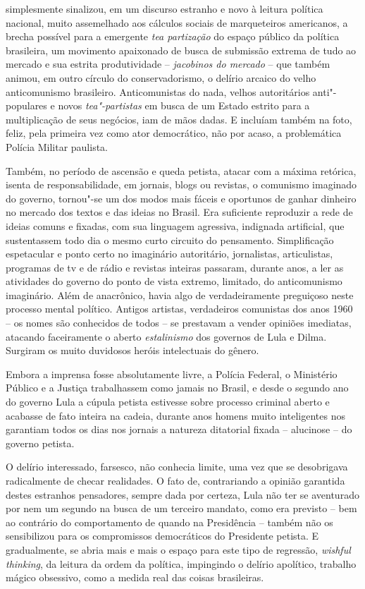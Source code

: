  simplesmente sinalizou, em um discurso estranho e novo à leitura
política nacional, muito assemelhado aos cálculos sociais de
marqueteiros americanos, a brecha possível para a emergente \emph{tea
partização} do espaço público da política brasileira, um movimento
apaixonado de busca de submissão extrema de tudo ao mercado e sua
estrita produtividade -- \emph{jacobinos do mercado} -- que também
animou, em outro círculo do conservadorismo, o delírio arcaico do velho
anticomunismo brasileiro. Anticomunistas do nada, velhos autoritários
anti"-populares e novos \emph{tea"-partistas} em busca de um Estado
estrito para a multiplicação de seus negócios, iam de mãos dadas. E
incluíam também na foto, feliz, pela primeira vez como ator democrático,
não por acaso, a problemática Polícia Militar paulista.

Também, no período de ascensão e queda petista, atacar com a máxima
retórica, isenta de responsabilidade, em jornais, blogs ou revistas, o
comunismo imaginado do governo, tornou"-se um dos modos mais fáceis e
oportunos de ganhar dinheiro no mercado dos textos e das ideias no
Brasil. Era suficiente reproduzir a rede de ideias comuns e fixadas, com
sua linguagem agressiva, indignada artificial, que sustentassem todo dia
o mesmo curto circuito do pensamento. Simplificação espetacular e ponto
certo no imaginário autoritário, jornalistas, articulistas, programas de
tv e de rádio e revistas inteiras passaram, durante anos, a ler as
atividades do governo do ponto de vista extremo, limitado, do
anticomunismo imaginário. Além de anacrônico, havia algo de
verdadeiramente preguiçoso neste processo mental político. Antigos
artistas, verdadeiros comunistas dos anos 1960 -- os nomes são
conhecidos de todos -- se prestavam a vender opiniões imediatas,
atacando faceiramente o aberto \emph{estalinismo} dos governos de Lula e
Dilma. Surgiram os muito duvidosos heróis intelectuais do gênero.

Embora a imprensa fosse absolutamente livre, a Polícia Federal, o
Ministério Público e a Justiça trabalhassem como jamais no Brasil, e
desde o segundo ano do governo Lula a cúpula petista estivesse sobre
processo criminal aberto e acabasse de fato inteira na cadeia, durante
anos homens muito inteligentes nos garantiam todos os dias nos jornais a
natureza ditatorial fixada -- alucinose -- do governo petista.

O delírio interessado, farsesco, não conhecia limite, uma vez que se
desobrigava radicalmente de checar realidades. O fato de, contrariando a
opinião garantida destes estranhos pensadores, sempre dada por certeza,
Lula não ter se aventurado por nem um segundo na busca de um terceiro
mandato, como era previsto -- bem ao contrário do comportamento de 
quando na Presidência -- também não os sensibilizou para os compromissos
democráticos do Presidente petista. E gradualmente, se abria mais e mais
o espaço para este tipo de regressão, \emph{wishful thinking}, da
leitura da ordem da política, impingindo o delírio apolítico, trabalho
mágico obsessivo, como a medida real das coisas brasileiras.


